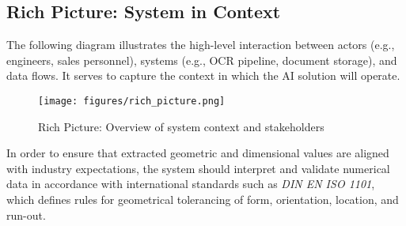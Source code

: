 \subsection*{Rich Picture: System in Context}

The following diagram illustrates the high-level interaction between actors (e.g., engineers, sales personnel), systems (e.g., OCR pipeline, document storage), and data flows. It serves to capture the context in which the AI solution will operate.

\begin{figure}[ht]
    \centering
    \texttt{[image: figures/rich\_picture.png]}
    \caption{Rich Picture: Overview of system context and stakeholders}
    \label{fig:rich_picture}
\end{figure}

\vspace{1em}
\noindent
In order to ensure that extracted geometric and dimensional values are aligned with industry expectations,
the system should interpret and validate numerical data in accordance with international standards such as
\textit{DIN EN ISO 1101}, which defines rules for geometrical tolerancing of form, orientation, location, and run-out.

